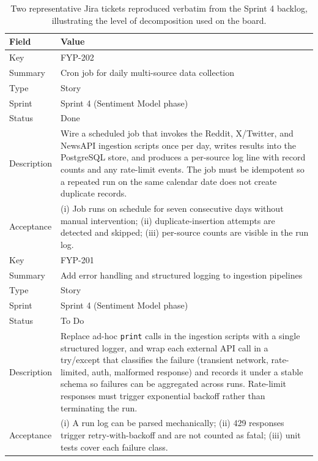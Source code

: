 \begin{table}[H]
\centering
\small
\begin{tabular}{@{}>{\raggedright\arraybackslash}p{2.2cm}>{\raggedright\arraybackslash}p{11.0cm}@{}}
\toprule
\textbf{Field} & \textbf{Value} \\
\midrule
Key           & FYP-202 \\
Summary       & Cron job for daily multi-source data collection \\
Type          & Story \\
Sprint        & Sprint 4 (Sentiment Model phase) \\
Status        & Done \\
Description   & Wire a scheduled job that invokes the Reddit, X/Twitter, and NewsAPI ingestion scripts once per day, writes results into the PostgreSQL store, and produces a per-source log line with record counts and any rate-limit events. The job must be idempotent so a repeated run on the same calendar date does not create duplicate records. \\
Acceptance    & (i) Job runs on schedule for seven consecutive days without manual intervention; (ii) duplicate-insertion attempts are detected and skipped; (iii) per-source counts are visible in the run log. \\
\midrule
Key           & FYP-201 \\
Summary       & Add error handling and structured logging to ingestion pipelines \\
Type          & Story \\
Sprint        & Sprint 4 (Sentiment Model phase) \\
Status        & To Do \\
Description   & Replace ad-hoc \texttt{print} calls in the ingestion scripts with a single structured logger, and wrap each external API call in a try/except that classifies the failure (transient network, rate-limited, auth, malformed response) and records it under a stable schema so failures can be aggregated across runs. Rate-limit responses must trigger exponential backoff rather than terminating the run. \\
Acceptance    & (i) A run log can be parsed mechanically; (ii) 429 responses trigger retry-with-backoff and are not counted as fatal; (iii) unit tests cover each failure class. \\
\bottomrule
\end{tabular}
\caption{Two representative Jira tickets reproduced verbatim from the Sprint 4 backlog, illustrating the level of decomposition used on the board.}
\label{tab:jira_examples}
\end{table}

